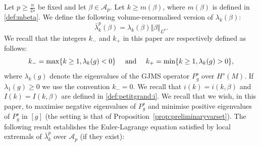 \documentclass[10pt]{amsart}
\numberwithin{equation}{section}
\def\la{{\lambda}}
\theoremstyle{plain}
\theoremstyle{remark}
\begin{document}
Let $p \geq \frac{n}{2s}$ be fixed and let $\beta \in \mathcal{A}_p$. Let $k \ge m(\beta)$, where $m(\beta)$ is defined in \eqref{def:mbeta}. We define the following volume-renormalised version of $\lambda_k(\beta)$:
\begin{equation} \label{def:lambdabar}
 \bar{\lambda}_k^p(\beta) = \lambda_k(\beta) \Vert \beta \Vert_{L^p}. %
 \end{equation}
We recall that the integers $k_{-}$ and $k_{+}$ in this paper are respectively defined as follows: 
\begin{equation} \label{defkk}
k_- = \max \{k \geq 1,  \la_k(g)<0 \}  \quad \hbox{ and } \quad k_+= \min\{k \geq 1, \la_k(g)>0 \},
\end{equation}
where $\la_k(g)$ denote the eigenvalues of the GJMS operator $P_g^s$ over $H^s(M)$. If $\lambda_1(g) \ge 0$ we use the convention $k_{-} = 0$. We recall that $i(k) = i(k, \beta)$ and $I(k) = I(k,\beta)$ are defined in \eqref{def:petitgrand:i}.  We recall that we wish, in this paper, to maximise negative eigenvalues of $P_g^s$ and minimise positive eigenvalues of $P_g^s$ in $[g]$ (the setting is that of Proposition~\ref{prop:preliminaryvarset}). The following result establishes the Euler-Lagrange equation satisfied by local extremals of $\bar{\lambda}_k^p $ over $\mathcal{A}_p$ (if they exist):
\end{document}

